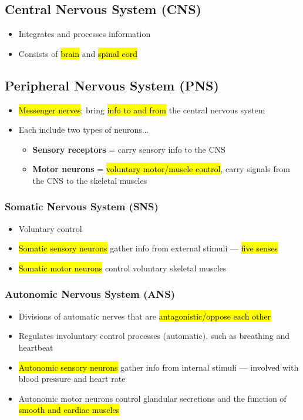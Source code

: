 \documentclass[a4paper,12pt]{article}
\begin{document}
\subsection{Central Nervous System (CNS)}
\begin{itemize}
    \item{Integrates and processes information}
    \item{Consists of \hl{brain} and \hl{spinal cord}}
\end{itemize}

\subsection{Peripheral Nervous System (PNS)}
\begin{itemize}
    \item{\hl{Messenger nerves}; bring \hl{info to and from} the central nervous system}
    \item{
            Each include two types of neurons...
            \begin{itemize}
                \item{\textbf{Sensory receptors} = carry sensory info to the CNS}
                \item{\textbf{Motor neurons} = \hl{voluntary motor/muscle control}, carry signals from the CNS to the skeletal muscles}
            \end{itemize}
        }

\end{itemize}

\subsubsection{Somatic Nervous System (SNS)}
\begin{itemize}
    \item{Voluntary control}
    \item{\hl{Somatic sensory neurons} gather info from external stimuli --- \hl{five senses}}
    \item{\hl{Somatic motor neurons} control voluntary skeletal muscles}
\end{itemize}

\subsubsection{Autonomic Nervous System (ANS)}
\begin{itemize}
    \item{Divisions of automatic nerves that are \hl{antagonistic/oppose each other}}
    \item{Regulates involuntary control processes (automatic), such as breathing and heartbeat}
    \item{\hl{Autonomic sensory neurons} gather info from internal stimuli --- involved with blood pressure and heart rate}
    \item{Autonomic motor neurons control glandular secretions and the function of \hl{smooth and cardiac muscles}}
                    \\
\end{itemize}
\end{document}
